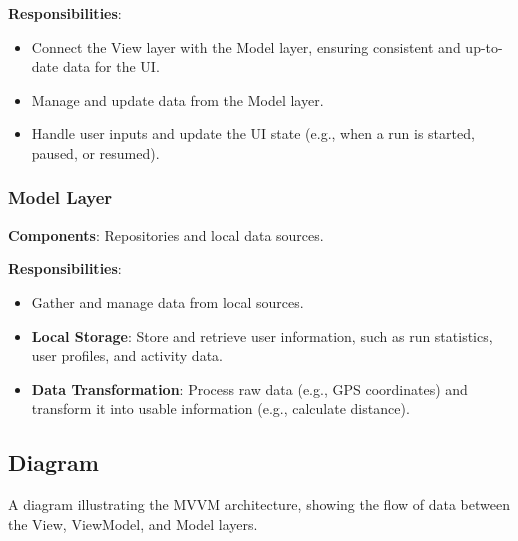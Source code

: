 \textbf{Responsibilities}:
\begin{itemize}
    \item Connect the View layer with the Model layer, ensuring consistent and up-to-date data for the UI.
    \item Manage and update data from the Model layer.
    \item Handle user inputs and update the UI state (e.g., when a run is started, paused, or resumed).
\end{itemize}

\subsubsection{Model Layer}

\textbf{Components}: Repositories and local data sources.

\textbf{Responsibilities}:
\begin{itemize}
    \item Gather and manage data from local sources.
    \item \textbf{Local Storage}: Store and retrieve user information, such as run statistics, user profiles, and activity data.
    \item \textbf{Data Transformation}: Process raw data (e.g., GPS coordinates) and transform it into usable information (e.g., calculate distance).
\end{itemize}

\subsection{Diagram}
A diagram illustrating the MVVM architecture, showing the flow of data between the View, ViewModel, and Model layers.


